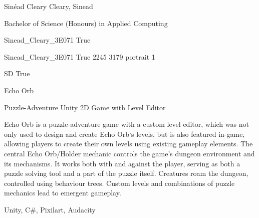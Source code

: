 \documentclass[twoside]{report}
\begin{document}
\begingroup{}\relax



\def\Key{Sinead_Cleary_3E071}

{Sinéad Cleary}
{Cleary, Sinead}

{Bachelor of Science (Honours) in Applied Computing}

{Sinead_Cleary_3E071}
{True}

{Sinead_Cleary_3E071}
{True}
{2245}
{3179}
{portrait}
{1}

{SD}
{True}

{Echo Orb}

{Puzzle-Adventure Unity 2D Game with Level Editor}

{Echo Orb is a puzzle-adventure game with a custom level editor, which was not only used to design and create Echo Orb\textquoteleft{}s levels, but is also featured in-game, allowing players to create their own levels using existing gameplay elements. The central Echo Orb/Holder mechanic controls the game\textquoteright{}s dungeon environment and its mechanisms. It works both with and against the player, serving as both a puzzle solving tool and a part of the puzzle itself. Creatures roam the dungeon, controlled using behaviour trees. Custom levels and combinations of puzzle mechanics lead to emergent gameplay.}

{Unity, C\#, Pixilart, Audacity}
\end{document}

